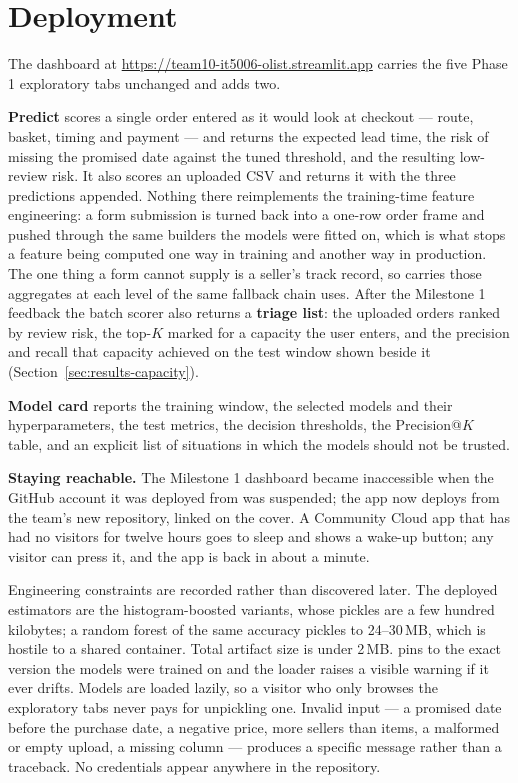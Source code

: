\section{Deployment}
\label{app:deployment}

The dashboard at \url{https://team10-it5006-olist.streamlit.app} carries the
five Phase 1 exploratory tabs unchanged and adds two.

\textbf{Predict} scores a single order entered as it would look at checkout ---
route, basket, timing and payment --- and returns the expected lead time, the
risk of missing the promised date against the tuned threshold, and the resulting
low-review risk. It also scores an uploaded CSV and returns it with the three
predictions appended. Nothing there reimplements the training-time feature
engineering: a form submission is turned back into a one-row order frame and
pushed through the same  builders the models were fitted on,
which is what stops a feature being computed one way in training and another way
in production. The one thing a form cannot supply is a seller's track record, so
 carries those aggregates at each level of the
same fallback chain  uses. After the Milestone 1 feedback
the batch scorer also returns a \textbf{triage list}: the uploaded orders ranked
by review risk, the top-$K$ marked for a capacity the user enters, and the
precision and recall that capacity achieved on the test window shown beside it
(Section~\ref{sec:results-capacity}).

\textbf{Model card} reports the training window, the selected models and their
hyperparameters, the test metrics, the decision thresholds, the Precision@$K$
table, and an explicit list of situations in which the models should not be
trusted.

\textbf{Staying reachable.} The Milestone 1 dashboard became inaccessible when
the GitHub account it was deployed from was suspended; the app now deploys from
the team's new repository, linked on the cover. A Community Cloud app that has
had no visitors for twelve hours goes to sleep and shows a wake-up button; any
visitor can press it, and the app is back in about a minute.

Engineering constraints are recorded rather than discovered later. The deployed
estimators are the histogram-boosted variants, whose pickles are a few hundred
kilobytes; a random forest of the same accuracy pickles to 24--30\,MB, which is
hostile to a shared container. Total artifact size is under 2\,MB.
 pins  to the exact version the models
were trained on and the loader raises a visible warning if it ever drifts. Models
are loaded lazily, so a visitor who only browses the exploratory tabs never pays
for unpickling one. Invalid input --- a promised date before the purchase date, a
negative price, more sellers than items, a malformed or empty upload, a missing
column --- produces a specific message rather than a traceback. No credentials
appear anywhere in the repository.

